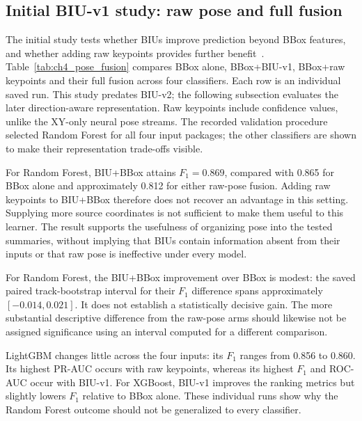 \subsection{Initial BIU-v1 study: raw pose and full fusion}

The initial study tests whether BIUs improve prediction beyond BBox features, and
whether adding raw keypoints provides further benefit~\cite{Pasha2026BIU}.
Table~\ref{tab:ch4_pose_fusion} compares BBox alone, BBox+BIU-v1, BBox+raw keypoints
and their full fusion across four classifiers. Each row is an individual saved run.
This study predates BIU-v2; the following subsection evaluates the later direction-aware
representation. Raw keypoints include confidence values, unlike the XY-only neural
pose streams.
The recorded validation procedure selected Random Forest for all four input packages;
the other classifiers are shown to make their representation trade-offs visible.



For Random Forest, BIU+BBox attains $F_1=0.869$, compared with 0.865 for BBox alone and approximately 0.812
for either raw-pose fusion. Adding raw keypoints to BIU+BBox therefore does not recover an
advantage in this setting. Supplying more source coordinates is not sufficient to make
them useful to this learner. The result supports the usefulness of organizing pose into
the tested summaries, without implying that BIUs contain information absent from their
inputs or that raw pose is ineffective under every model.

For Random Forest, the BIU+BBox improvement over BBox is modest: the saved paired track-bootstrap interval
for their $F_1$ difference spans approximately $[-0.014,0.021]$. It does not establish a
statistically decisive gain. The more substantial descriptive difference from the
raw-pose arms should likewise not be assigned significance using an interval computed
for a different comparison.

LightGBM changes little across the four inputs: its $F_1$ ranges from 0.856 to 0.860.
Its highest PR-AUC occurs with raw keypoints, whereas its highest $F_1$ and ROC-AUC
occur with BIU-v1. For XGBoost, BIU-v1 improves the ranking metrics but slightly lowers
$F_1$ relative to BBox alone. These individual runs show why the Random Forest outcome
should not be generalized to every classifier.


